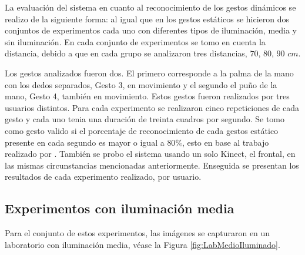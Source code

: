 La evaluación del sistema en cuanto al reconocimiento de los gestos dinámicos se realizo de la siguiente forma: al igual que en los gestos estáticos se hicieron dos conjuntos de experimentos cada uno con diferentes tipos de iluminación, media y sin iluminación. En cada conjunto de experimentos se tomo en cuenta la distancia, debido a que en cada grupo se analizaron tres distancias, $70$, $80$, $90$ $cm$. 

Los gestos analizados fueron dos. El primero corresponde a la palma de la mano con los dedos separados, Gesto 3, en movimiento y el segundo el puño de la mano, Gesto 4, también en movimiento. Estos gestos fueron realizados por tres usuarios distintos. Para cada experimento se realizaron cinco repeticiones de cada gesto y cada uno tenia una duración de treinta cuadros por segundo. Se tomo como gesto valido si el porcentaje de reconocimiento de cada gestos estático presente en cada segundo es mayor o igual a $80 \%$, esto en base al trabajo realizado por \citep{Sultana2012}. 
También se probo el sistema usando un solo Kinect, el frontal, en las mismas circunstancias mencionadas anteriormente. 
Enseguida se presentan los resultados de cada experimento realizado, por usuario. 


\subsection{Experimentos con iluminación media} 
Para el conjunto de estos experimentos, las imágenes se capturaron en un laboratorio con iluminación media, véase la Figura \ref{fig:LabMedioIluminado}.


